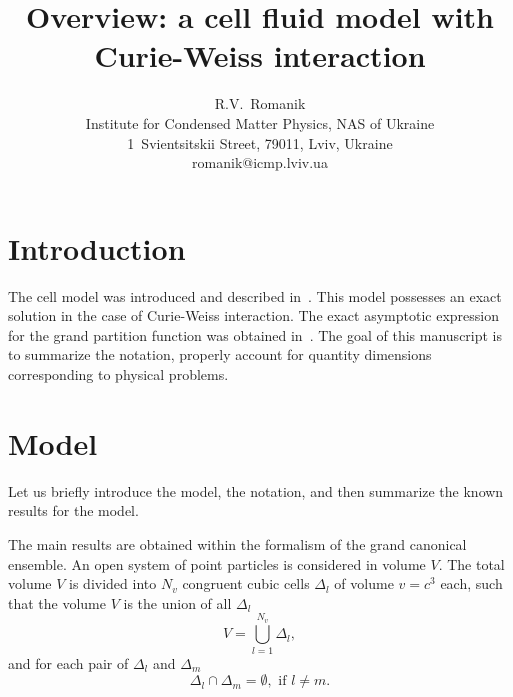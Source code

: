 \documentclass[12pt]{article}
\title{Overview: a cell fluid model with Curie-Weiss interaction}
\author{R.V.~Romanik
	\\ \small Institute for Condensed Matter Physics, NAS of Ukraine
	\\ \small 1~Svientsitskii Street, 79011, Lviv, Ukraine
	\\ \small romanik@icmp.lviv.ua}
\numberwithin{equation}{section}
\begin{document}
	
	\maketitle
	
	
	\section{Introduction}
	The cell model was introduced and described in~\cite{KKD18,KKD20}. This model possesses an exact solution in the case of Curie-Weiss interaction. The exact asymptotic expression for the grand partition function was obtained in~\cite{KKD20}.
	The goal of this manuscript is to summarize the notation, properly account for quantity dimensions corresponding to physical problems.
	
	\section{\label{sec:model} Model}
	Let us briefly introduce the model, the notation, and then summarize the known results for the model.
	
	The main results are obtained within the formalism of the grand canonical ensemble. An open system of point particles is considered in volume $V$. The total volume $V$ is divided into $N_v$ congruent cubic cells $\Delta_l$ of volume $v=c^3$ each, such that the volume $V$ is the union of all $\Delta_l$
	\begin{equation*}
		V = \bigcup_{l=1}^{N_v}\Delta_l,
	\end{equation*}
	and for each pair of $\Delta_l$ and $\Delta_m$
	\begin{equation*}
		\Delta_l \cap \Delta_m = \emptyset, \text{ if } l \neq m.
	\end{equation*}
	
\end{document}

